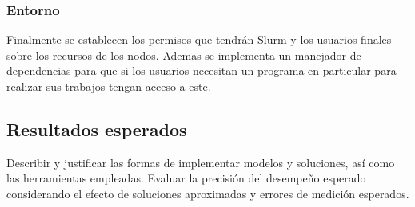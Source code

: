 \subsubsection{Entorno}
Finalmente se establecen los permisos que tendrán Slurm y los usuarios finales sobre los recursos de los nodos. Ademas se implementa un manejador de dependencias para que si los usuarios necesitan un programa en particular para realizar sus trabajos tengan acceso a este.


\subsection{Resultados esperados}
Describir y justificar las formas de implementar modelos y soluciones, así como las herramientas empleadas. Evaluar la precisión del desempeño esperado considerando el efecto de soluciones aproximadas y errores de medición esperados.
